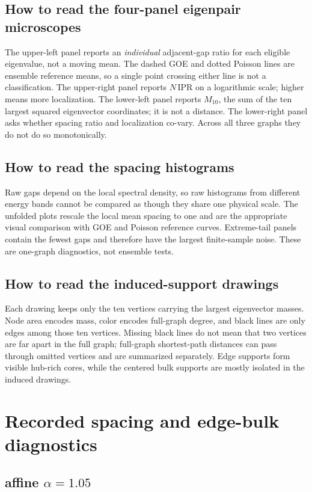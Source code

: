 \documentclass[10pt,letterpaper]{article}
\begin{document}
\subsection{How to read the four-panel eigenpair microscopes}
The upper-left panel reports an \emph{individual} adjacent-gap ratio for each eligible eigenvalue, not a moving mean. The dashed GOE and dotted Poisson lines are ensemble reference means, so a single point crossing either line is not a classification. The upper-right panel reports $N\,\mathrm{IPR}$ on a logarithmic scale; higher means more localization. The lower-left panel reports $M_{10}$, the sum of the ten largest squared eigenvector coordinates; it is not a distance. The lower-right panel asks whether spacing ratio and localization co-vary. Across all three graphs they do not do so monotonically.
\subsection{How to read the spacing histograms}
Raw gaps depend on the local spectral density, so raw histograms from different energy bands cannot be compared as though they share one physical scale. The unfolded plots rescale the local mean spacing to one and are the appropriate visual comparison with GOE and Poisson reference curves. Extreme-tail panels contain the fewest gaps and therefore have the largest finite-sample noise. These are one-graph diagnostics, not ensemble tests.
\subsection{How to read the induced-support drawings}
Each drawing keeps only the ten vertices carrying the largest eigenvector masses. Node area encodes mass, color encodes full-graph degree, and black lines are only edges among those ten vertices. Missing black lines do not mean that two vertices are far apart in the full graph; full-graph shortest-path distances can pass through omitted vertices and are summarized separately. Edge supports form visible hub-rich cores, while the centered bulk supports are mostly isolated in the induced drawings.
\section{Recorded spacing and edge-bulk diagnostics}
\subsection{affine $\alpha=1.05$}
\end{document}

